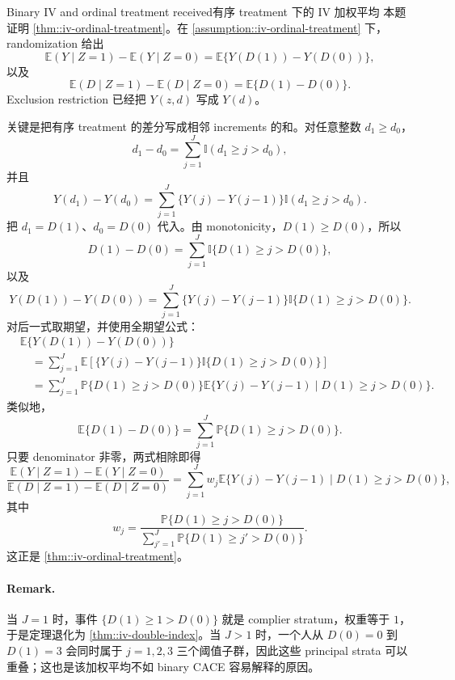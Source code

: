 \begin{exercisesolution}{Binary IV and ordinal treatment received}{有序 treatment 下的 IV 加权平均}
本题证明 \cref{thm::iv-ordinal-treatment}。在 \cref{assumption::iv-ordinal-treatment} 下，randomization 给出
\[
\mathbb{E}(Y\mid Z=1)-\mathbb{E}(Y\mid Z=0)
=
\mathbb{E}\{Y(D(1))-Y(D(0))\},
\]
以及
\[
\mathbb{E}(D\mid Z=1)-\mathbb{E}(D\mid Z=0)
=
\mathbb{E}\{D(1)-D(0)\}.
\]
Exclusion restriction 已经把 $Y(z,d)$ 写成 $Y(d)$。

关键是把有序 treatment 的差分写成相邻 increments 的和。对任意整数 $d_1\geq d_0$，
\[
d_1-d_0
=
\sum_{j=1}^J \mathbb{I}(d_1\geq j>d_0),
\]
并且
\[
Y(d_1)-Y(d_0)
=
\sum_{j=1}^J \{Y(j)-Y(j-1)\}\mathbb{I}(d_1\geq j>d_0).
\]
把 $d_1=D(1)$、$d_0=D(0)$ 代入。由 monotonicity，$D(1)\geq D(0)$，所以
\[
D(1)-D(0)
=
\sum_{j=1}^J \mathbb{I}\{D(1)\geq j>D(0)\},
\]
以及
\[
Y(D(1))-Y(D(0))
=
\sum_{j=1}^J
\{Y(j)-Y(j-1)\}\mathbb{I}\{D(1)\geq j>D(0)\}.
\]
对后一式取期望，并使用全期望公式：
\begin{align*}
&\mathbb{E}\{Y(D(1))-Y(D(0))\}\\
&\quad =
\sum_{j=1}^J
\mathbb{E}\left[
\{Y(j)-Y(j-1)\}\mathbb{I}\{D(1)\geq j>D(0)\}
\right]\\
&\quad =
\sum_{j=1}^J
\mathbb{P}\{D(1)\geq j>D(0)\}
\mathbb{E}\{Y(j)-Y(j-1)\mid D(1)\geq j>D(0)\}.
\end{align*}
类似地，
\[
\mathbb{E}\{D(1)-D(0)\}
=
\sum_{j=1}^J
\mathbb{P}\{D(1)\geq j>D(0)\}.
\]
只要 denominator 非零，两式相除即得
\[
\frac{\mathbb{E}(Y\mid Z=1)-\mathbb{E}(Y\mid Z=0)}
{\mathbb{E}(D\mid Z=1)-\mathbb{E}(D\mid Z=0)}
=
\sum_{j=1}^J w_j
\mathbb{E}\{Y(j)-Y(j-1)\mid D(1)\geq j>D(0)\},
\]
其中
\[
w_j
=
\frac{\mathbb{P}\{D(1)\geq j>D(0)\}}
{\sum_{j'=1}^J\mathbb{P}\{D(1)\geq j'>D(0)\}}.
\]
这正是 \cref{thm::iv-ordinal-treatment}。

\paragraph{Remark.}
当 $J=1$ 时，事件 $\{D(1)\geq1>D(0)\}$ 就是 complier stratum，权重等于 $1$，于是定理退化为 \cref{thm::iv-double-index}。当 $J>1$ 时，一个人从 $D(0)=0$ 到 $D(1)=3$ 会同时属于 $j=1,2,3$ 三个阈值子群，因此这些 principal strata 可以重叠；这也是该加权平均不如 binary CACE 容易解释的原因。
\end{exercisesolution}

